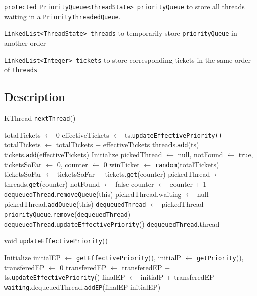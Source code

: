 \documentclass{article}
\begin{document}
\begin{spacing}{1.1}
\texttt{protected PriorityQueue<ThreadState> priorityQueue} to store all threads waiting in a \texttt{PriorityThreadedQueue}.

\texttt{LinkedList<ThreadState> threads} to temporarily store \texttt{priorityQueue} in another order

\texttt{LinkedList<Integer> tickets} to store corresponding tickets in the same order of \texttt{threads}

\subsection{Description}

\begin{algorithm}[htbp]
  \caption{KThread \texttt{nextThread}()}
\begin{algorithmic}[1]
  \STATE totalTickets $\gets$ 0
    \STATE effectiveTickets $\gets$ ts.\texttt{updateEffectivePriority()}
    \STATE totalTickets $\gets$ totalTickets + effectiveTickets
    \STATE threads.\texttt{add}(ts)
    \STATE tickets.\texttt{add}(effectiveTickets)
  \ENDFOR
  \STATE Initialize pickedThread $\leftarrow$ null, notFound $\leftarrow$ true, ticketsSoFar $\leftarrow$ 0, counter $\leftarrow$ 0
  \STATE winTicket $\leftarrow$ \texttt{random}(totalTickets)
    \STATE ticketsSoFar $\leftarrow$ ticketsSoFar + tickets.\texttt{get}(counter)
      \STATE pickedThread $\leftarrow$ threads.\texttt{get}(counter)
      \STATE notFound $\leftarrow$ false
    \ENDIF
    \STATE counter $\leftarrow$ counter + 1
  \ENDWHILE
  \STATE \texttt{dequeuedThread}.\texttt{removeQueue}(this)
  \STATE pickedThread.waiting $\leftarrow$ null
  \STATE pickedThread.\texttt{addQueue}(this)
  \STATE \texttt{dequeuedThread} $\leftarrow$ pickedThread
  \STATE \texttt{priorityQueue}.\texttt{remove}(\texttt{dequeuedThread})
  \STATE \texttt{dequeuedThread}.\texttt{updateEffectivePriority}()
  \RETURN \texttt{dequeuedThread}.thread
\end{algorithmic}
\end{algorithm}

\begin{algorithm}[htbp]
  \caption{void \texttt{updateEffectivePriority}()}
\begin{algorithmic}[1]
  \STATE Initialize initialEP $\leftarrow$ \texttt{getEffectivePriority}(), initialP $\leftarrow$ \texttt{getPriority}(), transferedEP $\leftarrow$ 0
      \STATE transferedEP $\leftarrow$ transferedEP + ts.\texttt{updateEffectivePriority}()
    \ENDFOR
  \ENDFOR
  \STATE finalEP $\leftarrow$ initialP + transferedEP
  \STATE \texttt{waiting}.dequeuedThread.\texttt{addEP}(finalEP-initialEP)
\end{algorithmic}
\end{algorithm}


\end{spacing}
\end{document}
